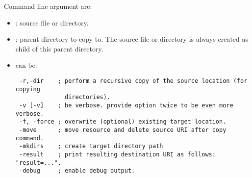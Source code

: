 Command line argument are: 
\begin{itemize}
  \item {} : source file or directory.
  \item {} : parent directory to copy to. The source
        file  or directory is always created as child of this parent
        directory.
  \item \Path{ [options] } can be: 

\hspace*{10mm}\begin{minipage}{170mm}
\begin{verbatim}
 -r,-dir    ; perform a recursive copy of the source location (for copying 
              directories). 
 -v [-v]    ; be verbose. provide option twice to be even more verbose. 
 -f, -force ; overwrite (optional) existing target location. 
 -move      ; move resource and delete source URI after copy command.
 -mkdirs    ; create target directory path 
 -result    ; print resulting destination URI as follows: "result=...".
 -debug     ; enable debug output.
\end{verbatim}
\end{minipage}
\end{itemize}

